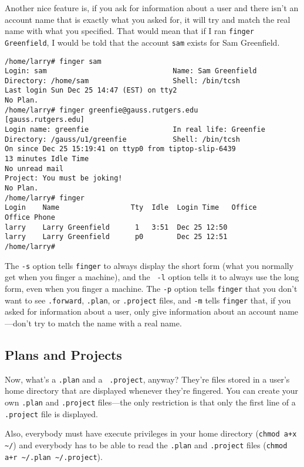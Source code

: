 Another nice feature is, if you ask for information about a user and
there isn't an account name that is exactly what you asked for, it
will try and match the real name with what you specified. That would
mean that if I ran {\tt finger Greenfield}, I would be told that the
account {\tt sam} exists for Sam Greenfield.

\begin{screen}\begin{verbatim}
/home/larry# finger sam
Login: sam                              Name: Sam Greenfield
Directory: /home/sam                    Shell: /bin/tcsh
Last login Sun Dec 25 14:47 (EST) on tty2
No Plan.
/home/larry# finger greenfie@gauss.rutgers.edu
[gauss.rutgers.edu]
Login name: greenfie                    In real life: Greenfie
Directory: /gauss/u1/greenfie           Shell: /bin/tcsh
On since Dec 25 15:19:41 on ttyp0 from tiptop-slip-6439
13 minutes Idle Time
No unread mail
Project: You must be joking!
No Plan.
/home/larry# finger
Login    Name                 Tty  Idle  Login Time   Office     Office Phone
larry    Larry Greenfield      1   3:51  Dec 25 12:50
larry    Larry Greenfield      p0        Dec 25 12:51
/home/larry# 
\end{verbatim}\end{screen}

The {\tt -s} option tells {\tt finger} to always display the short
form (what you normally get when you finger a machine), and the {\tt
  -l} option tells it to always use the long form, even when you
finger a machine. The {\tt -p} option tells {\tt finger} that you
don't want to see {\tt .forward}, {\tt .plan}, or {\tt .project}
files, and {\tt -m} tells {\tt finger} that, if you asked for
information about a user, only give information about an account
name---don't try to match the name with a real name.

\subsection{Plans and Projects}

Now, what's a {\tt .plan} and a {\tt
  .project}, anyway? They're files stored in a
user's home directory that are displayed whenever they're fingered.
You can create your own {\tt .plan} and {\tt .project} files---the
only restriction is that only the first line of a {\tt .project} file
is displayed.

Also, everybody must have execute privileges in your home directory
({\tt chmod a+x \verb+~+/}) and everybody has to be able to read the
{\tt .plan} and {\tt .project} files ({\tt chmod a+r \verb+~+/.plan
  \verb+~+/.project}).

